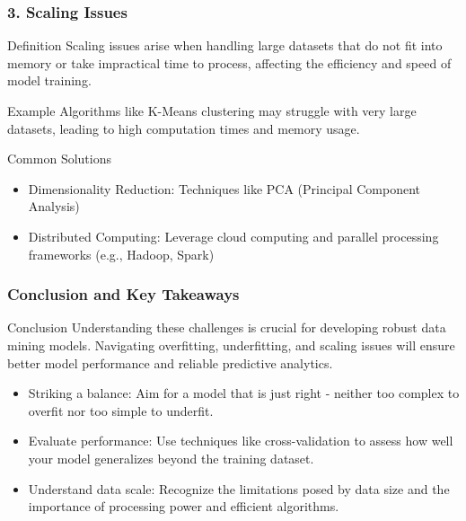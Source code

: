 \documentclass[aspectratio=169]{beamer}
\begin{document}
\begin{frame}[fragile]
    \frametitle{3. Scaling Issues}
    \begin{block}{Definition}
        Scaling issues arise when handling large datasets that do not fit into memory or take impractical time to process, affecting the efficiency and speed of model training.
    \end{block}
    \begin{block}{Example}
        Algorithms like K-Means clustering may struggle with very large datasets, leading to high computation times and memory usage.
    \end{block}
    \begin{block}{Common Solutions}
        \begin{itemize}
            \item Dimensionality Reduction: Techniques like PCA (Principal Component Analysis)
            \item Distributed Computing: Leverage cloud computing and parallel processing frameworks (e.g., Hadoop, Spark)
        \end{itemize}
    \end{block}
\end{frame}

\begin{frame}[fragile]
    \frametitle{Conclusion and Key Takeaways}
    \begin{block}{Conclusion}
        Understanding these challenges is crucial for developing robust data mining models. Navigating overfitting, underfitting, and scaling issues will ensure better model performance and reliable predictive analytics.
    \end{block}
    \begin{itemize}
        \item Striking a balance: Aim for a model that is just right - neither too complex to overfit nor too simple to underfit.
        \item Evaluate performance: Use techniques like cross-validation to assess how well your model generalizes beyond the training dataset.
        \item Understand data scale: Recognize the limitations posed by data size and the importance of processing power and efficient algorithms.
    \end{itemize}
\end{frame}
\end{document}
